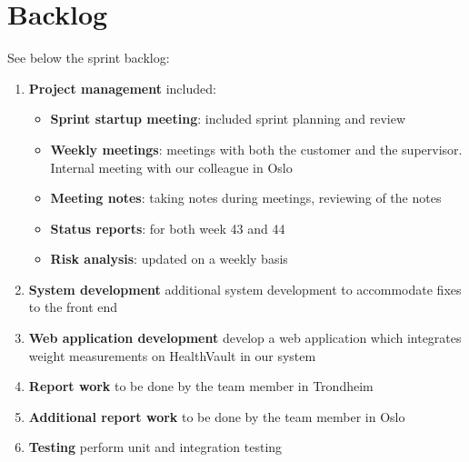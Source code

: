 \section{Backlog}
See below the sprint backlog:
\begin{enumerate}[1.]
\item \textbf{Project management} included:
	\begin{itemize}
		\item \textbf{Sprint startup meeting}:
			included sprint planning and review
		\item \textbf{Weekly meetings}: 
			meetings with both the customer and the supervisor. Internal meeting with our colleague in Oslo
		\item \textbf{Meeting notes}:
			taking notes during meetings, reviewing of the notes
		\item \textbf{Status reports}:
			for both week 43 and 44
		\item \textbf{Risk analysis}:
			updated on a weekly basis
	\end{itemize}
	\item \textbf{System development}
		additional system development to accommodate fixes to the front end
	\item \textbf{Web application development}
		develop a web application which integrates weight measurements
		on HealthVault in our system
	\item \textbf{Report work}
		to be done by the team member in Trondheim
	\item \textbf{Additional report work}
		to be done by the team member in Oslo
	\item \textbf{Testing}
		perform unit and integration testing
\end{enumerate}

